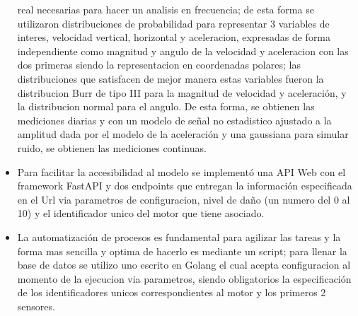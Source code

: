 \begin{itemize}
        real necesarias para hacer un analisis en frecuencia; de esta forma se
        utilizaron distribuciones de probabilidad para representar 3 variables de interes,
        velocidad vertical, horizontal y aceleracion, expresadas de forma independiente
        como magnitud y angulo de la velocidad y aceleracion con las dos primeras
        siendo la representacion en coordenadas polares; las distribuciones que
        satisfacen de mejor manera estas variables fueron la distribucion Burr
        de tipo III para la magnitud de velocidad y aceleración, y la distribucion
        normal para el angulo. De esta forma, se obtienen las mediciones diarias
        y con un modelo de señal no estadistico ajustado a la amplitud dada por
        el modelo de la aceleración y una gaussiana para simular ruido, se obtienen
        las mediciones continuas.
    \item Para facilitar la accesibilidad al modelo se implementó una API Web con
        el framework FastAPI y dos endpoints que entregan la información especificada
        en el Url via parametros de configuracion, nivel de daño (un numero del 0 al 10)
        y el identificador unico del motor que tiene asociado.
    \item La automatización de procesos es fundamental para agilizar las tareas y
        la forma mas sencilla y optima de hacerlo es mediante un script; para
        llenar la base de datos se utilizo uno escrito en Golang el cual acepta
        configuracion al momento de la ejecucion via parametros, siendo obligatorios
        la especificación de los identificadores unicos correspondientes al motor
        y los primeros 2 sensores.

\end{itemize}
